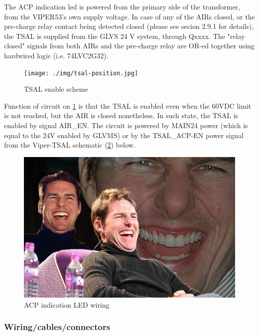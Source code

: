 The ACP indication led is powered from the primary side of the transformer, from the VIPER53's own supply voltage.
In case of any of the AIRs closed, or the pre-charge relay contact being detected closed (please see secion 2.9.1  for details), the TSAL is supplied from the GLVS 24 V system, through Qxxxx. The "relay closed" signals from both AIRs and the pre-charge relay are OR-ed together using hardwired logic (i.e. 74LVC2G32).

\begin{figure}[H]
	\centering
	\texttt{[image: ./img/tsal-position.jpg]}
	\caption{TSAL enable scheme}
	\label{fig:TSAL-enable}
\end{figure}

Function of circuit on \ref{fig:TSAL-enable} is that the TSAL is enabled even when the 60VDC limit is not reached, but the AIR is closed nonetheless. In such state, the TSAL is enabled by signal AIR\_EN. The circuit is powered by MAIN24 power (which is equal to the 24V enabled by GLVMS) or by the TSAL\_ACP-EN power signal from the Viper-TSAL schematic (\ref{fig:TSAL-ACPindicator}) below.

\begin{figure}[H]
	\centering
	\includegraphics[width=\textwidth]{./img/tsal-indicator.jpg}
	\caption{ACP indication LED wiring}
	\label{fig:TSAL-ACPindicator}
\end{figure}

\subsubsection{Wiring/cables/connectors}


